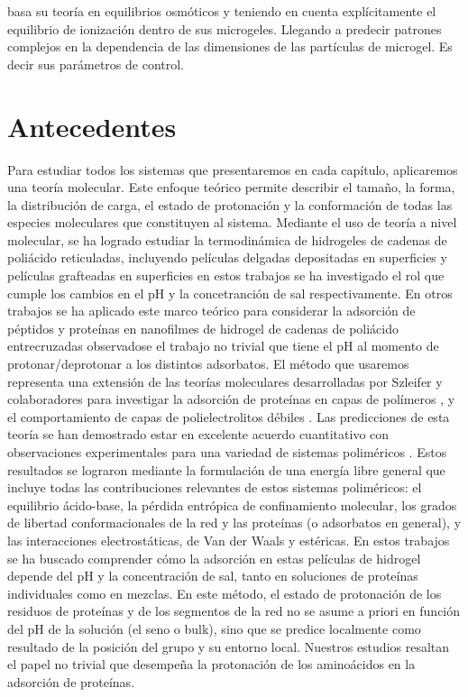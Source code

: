 \citet{polotsky2013collapse} basa su teor\'ia en equilibrios osm\'oticos y teniendo en cuenta expl\'icitamente el equilibrio de ionizaci\'on dentro de sus microgeles. Llegando a predecir patrones complejos en la dependencia de las dimensiones de las part\'iculas de microgel. Es decir sus par\'ametros de control.
	

\section{Antecedentes}

Para estudiar todos los sistemas que presentaremos en cada cap\'itulo, aplicaremos una teor\'ia molecular.
Este enfoque te\'orico permite describir el tama\~no, la forma, la distribuci\'on de carga, el estado de protonaci\'on y la conformaci\'on de todas las especies moleculares que constituyen al sistema. 
Mediante el uso de teor\'ia a nivel molecular, se ha logrado estudiar la termodin\'amica de hidrogeles de cadenas de poli\'acido reticuladas, incluyendo pel\'iculas delgadas depositadas en superficies \cite{longo2012molecular} y pel\'iculas grafteadas en superficies \cite{longo2014non} en estos trabajos se ha investigado el rol que cumple los cambios en el pH y la concetranci\'on de sal respectivamente. En otros trabajos se ha aplicado este marco te\'orico para considerar la adsorci\'on de p\'eptidos y prote\'inas en nanofilmes de hidrogel de cadenas de poli\'acido entrecruzadas \cite{longo2014equilibrium,narambuena2015lysozyme,longo2016adsorption} observadose el trabajo no trivial que tiene el pH al momento de protonar/deprotonar a los distintos adsorbatos. El m\'etodo que usaremos representa una extensi\'on de las teor\'ias moleculares desarrolladas por Szleifer y colaboradores para investigar la adsorci\'on de prote\'inas en capas de pol\'imeros \cite{hagemann2018use,szleifer1997protein,fang2005kinetics}, y el comportamiento de capas de polielectrolitos d\'ebiles \cite{nap2006weak}. Las predicciones de esta teor\'ia se han demostrado estar en excelente acuerdo cuantitativo con observaciones experimentales para una variedad de sistemas polim\'ericos \cite{tagliazucchi2010responsive,wu2007behavior}.
Estos resultados se lograron mediante la formulaci\'on de una energ\'ia libre general que incluye todas las contribuciones relevantes de estos sistemas polim\'ericos: el equilibrio \'acido-base, la p\'erdida entr\'opica de confinamiento molecular, los grados de libertad conformacionales de la red y las prote\'inas (o adsorbatos en general), y las interacciones electrost\'aticas, de Van der Waals y est\'ericas. En estos trabajos se ha buscado comprender c\'omo la adsorci\'on en estas pel\'iculas de hidrogel depende del pH y la concentraci\'on de sal, tanto en soluciones de prote\'inas individuales como en mezclas. En este m\'etodo, el estado de protonaci\'on de los residuos de prote\'inas y de los segmentos de la red no se asume a priori en funci\'on del pH de la soluci\'on (el seno o bulk), sino que se predice localmente como resultado de la posici\'on del grupo y su entorno local. Nuestros estudios resaltan el papel no trivial que desempe\~na la protonaci\'on de los amino\'acidos en la adsorci\'on de prote\'inas. 

